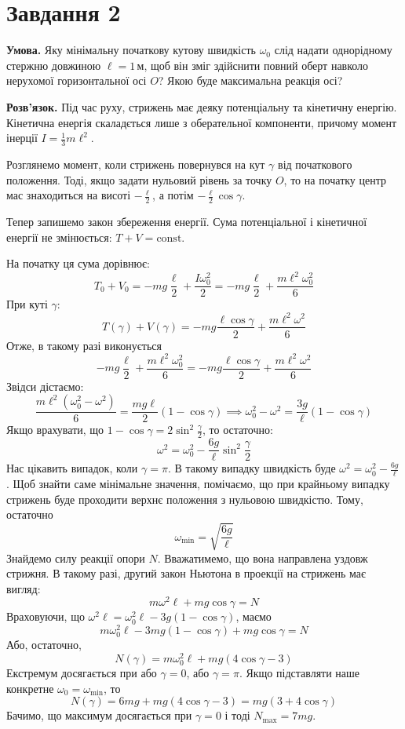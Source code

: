 \documentclass[14pt]{extarticle}
\begin{document}
\pagebreak
\section*{Завдання 2}

\textbf{Умова.} Яку мінімальну початкову кутову швидкість $\omega_0$ слід надати однорідному стержню довжиною $\ell=1\,\text{м}$, щоб він зміг здійснити
повний оберт навколо нерухомої горизонтальної осі $O$? Якою буде максимальна реакція осі?

\textbf{Розв'язок.} Під час руху, стрижень має деяку потенціальну та кінетичну енергію. Кінетична енергія скаладється лише з оберательної компоненти, причому момент інерції $I=\frac{1}{3}m\ell^2$. 

Розглянемо момент, коли стрижень повернувся на кут $\gamma$ від початкового положення. Тоді, якщо задати нульовий рівень за точку $O$, то на початку центр мас знаходиться на висоті $-\frac{\ell}{2}$, а потім $-\frac{\ell}{2}\cos \gamma$.

Тепер запишемо закон збереження енергії. Сума потенціальної і кінетичної енергії не змінюється: $T+V=\text{const}$.

На початку ця сума дорівнює:
\[
T_0 + V_0 = -mg\frac{\ell}{2}+\frac{I\omega_0^2}{2} = -mg\frac{\ell}{2} + \frac{m\ell^2\omega_0^2}{6}
\]
При куті $\gamma$:
\[
T(\gamma)+V(\gamma) = -mg \frac{\ell \cos\gamma}{2} + \frac{m\ell^2\omega^2}{6}
\]
Отже, в такому разі виконується
\[
-mg\frac{\ell}{2} + \frac{m\ell^2\omega_0^2}{6} = -mg\frac{\ell \cos\gamma}{2} + \frac{m\ell^2\omega^2}{6}
\]
Звідси дістаємо:
\[
\frac{m\ell^2(\omega_0^2-\omega^2)}{6} = \frac{mg\ell}{2}(1-\cos\gamma) \implies \omega_0^2-\omega^2 = \frac{3g}{\ell}(1-\cos\gamma)
\]
Якщо врахувати, що $1-\cos\gamma=2\sin^2{\frac{\gamma}{2}}$, то остаточно:
\[
\omega^2 = \omega_0^2 - \frac{6g}{\ell} \sin^2 \frac{\gamma}{2}
\]
Нас цікавить випадок, коли $\gamma=\pi$. В такому випадку швидкість буде $\omega^2 = \omega_0^2 - \frac{6g}{\ell}$. Щоб знайти саме мінімальне значення, помічаємо, що при крайньому випадку стрижень буде проходити верхнє положення з нульовою швидкістю. Тому, остаточно
\[
\boxed{\omega_{\min} = \sqrt{\frac{6g}{\ell}}}
\]
Знайдемо силу реакції опори $N$. Вважатимемо, що вона направлена уздовж стрижня. В такому разі, другий закон Ньютона в проекції на стрижень має вигляд:
\[
m\omega^2 \ell + mg \cos\gamma = N
\]
Враховуючи, що $\omega^2\ell=\omega_0^2\ell - 3g(1-\cos\gamma)$, маємо
\[
m\omega_0^2\ell - 3mg(1-\cos\gamma) + mg\cos\gamma = N
\]
Або, остаточно,
\[
N(\gamma) = m\omega_0^2\ell + mg(4\cos\gamma - 3)
\]
Екстремум досягається при або $\gamma=0$, або $\gamma=\pi$. Якщо підставляти наше конкретне $\omega_0=\omega_{\min}$, то
\[
N(\gamma) = 6mg + mg(4\cos\gamma - 3) = mg(3 + 4\cos\gamma)
\]
Бачимо, що максимум досягається при $\gamma=0$ і тоді $N_{\max}=7mg$. 
\end{document}
